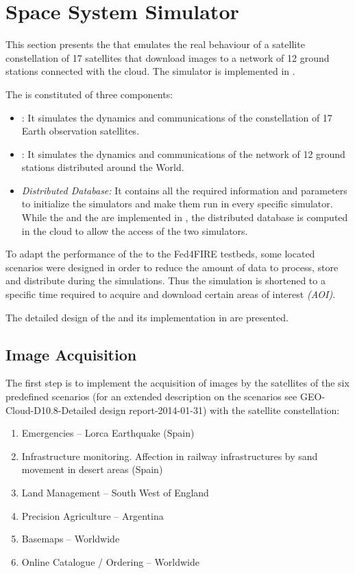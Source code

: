 \section{Space System Simulator}

This section presents the \sss that emulates the real behaviour of a satellite constellation of 17 satellites that download images to a network of 12 ground stations connected with the \bonfire cloud. The simulator is implemented in \vw.

The \sss is constituted of three components:
\begin{itemize}
\item \satss: It simulates the dynamics and communications of the constellation of 17 Earth observation satellites.
\item \gsss: It simulates the dynamics and communications of the network of 12 ground stations distributed around the World.
\item \emph{Distributed Database:} It contains all the required information and parameters to initialize the simulators and make them run in every specific simulator.
While the \satss and the \gsss are implemented in \vw, the distributed database
is computed in the \bonfire cloud to allow the access of the two simulators.
\end{itemize}

To adapt the performance of the \sss to the Fed4FIRE testbeds, some located scenarios were designed in order to reduce the amount of data to process, store and distribute during the simulations. Thus the simulation is shortened to a specific time required to acquire and download certain areas of interest \emph{(AOI)}.

The detailed design of the \sss and its implementation in \vw are presented.

\subsection{Image Acquisition}

The first step is to implement the acquisition of images by the satellites of
the six predefined scenarios (for an extended description on the scenarios see
GEO-Cloud-D10.8-Detailed design report-2014-01-31) with the satellite
constellation: 
\begin{enumerate}[label=\bfseries Scenario \arabic*:]
\item Emergencies – Lorca Earthquake (Spain)
\item  Infrastructure monitoring. Affection in railway infrastructures by sand movement in desert areas (Spain)
\item Land Management – South West of England
\item Precision Agriculture – Argentina
\item Basemaps – Worldwide
\item Online Catalogue / Ordering – Worldwide
\end{enumerate}

